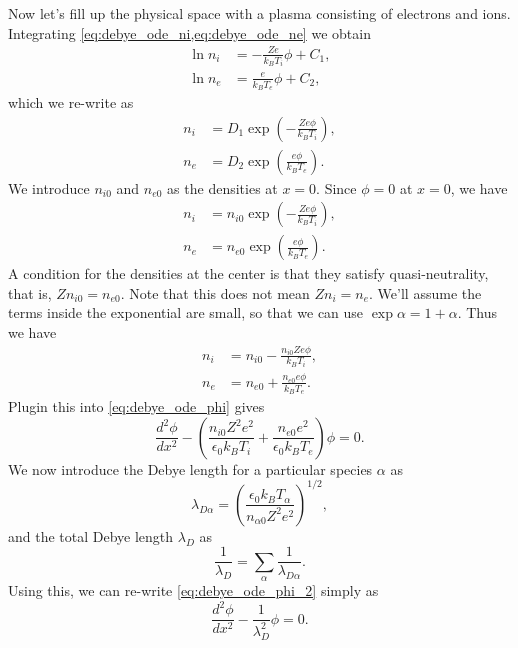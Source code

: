 \documentclass[a4paper,11pt]{report}
\begin{document}
Now let's fill up the physical space with a plasma consisting of electrons and ions. Integrating \cref{eq:debye_ode_ni,eq:debye_ode_ne} we obtain
\begin{align*}
    \ln n_i &= -\frac{Z e}{k_B T_i} \phi + C_1, \\
    \ln n_e &= \frac{e}{k_B T_e} \phi + C_2,
\end{align*}
which we re-write as
\begin{align*}
    n_i &= D_1 \exp \left ( -\frac{Ze\phi}{k_B T_i} \right ), \\
    n_e &= D_2 \exp \left ( \frac{e\phi}{k_B T_e} \right ).
\end{align*}
We introduce $n_{i0}$ and $n_{e0}$ as the densities at $x=0$. Since $\phi = 0$ at $x=0$, we have 
\begin{align*}
    n_i &= n_{i0} \exp \left ( -\frac{Ze\phi}{k_B T_i} \right ), \\
    n_e &= n_{e0} \exp \left ( \frac{e\phi}{k_B T_e} \right ).
\end{align*}
A condition for the densities at the center is that they satisfy quasi-neutrality, that is, $Zn_{i0} = n_{e0}$. Note that this does not mean $Zn_i = n_e$. We'll assume the terms inside the exponential are small, so that we can use $\exp \alpha = 1 + \alpha$. Thus we have
\begin{align*}
    n_i &= n_{i0} - \frac{n_{i0}Ze\phi}{k_B T_i}, \\
    n_e &= n_{e0} + \frac{n_{e0} e\phi}{k_B T_e}.
\end{align*}
Plugin this into \cref{eq:debye_ode_phi} gives
\begin{equation}
    \label{eq:debye_ode_phi_2}
    \frac{d^2\phi}{dx^2} - \left ( \frac{n_{i0}Z^2 e^2}{\epsilon_0 k_B T_i} + \frac{n_{e0}e^2}{\epsilon_0 k_B T_e}\right ) \phi = 0.
\end{equation}
We now introduce the Debye length for a particular species $\alpha$ as
\begin{equation}
    \label{eq:debye_def}
    \lambda_{D\alpha} = \left ( \frac{\epsilon_0 k_B T_\alpha}{n_{\alpha0} Z^2 e^2} \right )^{1/2},
\end{equation}
and the total Debye length $\lambda_D$ as
\begin{equation}
    \frac{1}{\lambda_D} = \sum_\alpha \frac{1}{\lambda_{D\alpha}}.
\end{equation}
Using this, we can re-write \cref{eq:debye_ode_phi_2} simply as
\begin{equation}
    \frac{d^2 \phi}{dx^2} - \frac{1}{\lambda_D^2} \phi = 0.
\end{equation}
\end{document}
